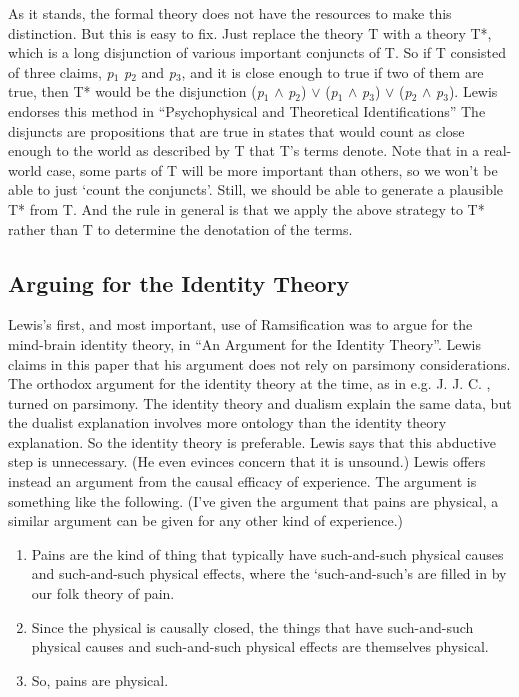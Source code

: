 As it stands, the formal theory does not have the resources to make this distinction. But this is easy to fix. Just replace the theory T with a theory T*, which is a long disjunction of various important conjuncts of T. So if T consisted of three claims, \textit{p}\(_\text{1}\) \textit{p}\(_\text{2}\) and \textit{p}\(_\text{3}\), and it is close enough to true if two of them are true, then T* would be the disjunction (\textit{p}\(_\text{1}\) \(\wedge\) \textit{p}\(_\text{2}\)) \(\vee\) (\textit{p}\(_\text{1}\) \(\wedge\) \textit{p}\(_\text{3}\)) \(\vee\) (\textit{p}\(_\text{2}\) \(\wedge\) \textit{p}\(_\text{3}\)). Lewis endorses this method in ``Psychophysical and Theoretical Identifications'' The disjuncts are propositions that are true in states that would count as close enough to the world as described by T that T's terms denote. Note that in a real-world case, some parts of T will be more important than others, so we won't be able to just `count the conjuncts'. Still, we should be able to generate a plausible T* from T. And the rule in general is that we apply the above strategy to T* rather than T to determine the denotation of the terms.

\subsection{Arguing for the Identity Theory} 
Lewis's first, and most important, use of Ramsification was to argue for the mind-brain identity theory, in ``An Argument for the Identity Theory''. Lewis claims in this paper that his argument does not rely on parsimony considerations. The orthodox argument for the identity theory at the time, as in e.g. J. J. C. \citet{Smart1959}, turned on parsimony. The identity theory and dualism explain the same data, but the dualist explanation involves more ontology than the identity theory explanation. So the identity theory is preferable. Lewis says that this abductive step is unnecessary. (He even evinces concern that it is unsound.) Lewis offers instead an argument from the causal efficacy of experience. The argument is something like the following. (I've given the argument that pains are physical, a similar argument can be given for any other kind of experience.)

\begin{enumerate}

\item Pains are the kind of thing that typically have such-and-such physical causes and such-and-such physical effects, where the `such-and-such's are filled in by our folk theory of pain.

\item Since the physical is causally closed, the things that have such-and-such physical causes and such-and-such physical effects are themselves physical.

\item So, pains are physical.

\end{enumerate}

